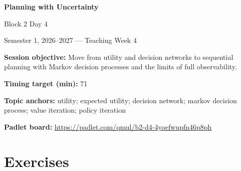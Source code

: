 \documentclass[11pt]{article}
\begin{document}
\begin{center}\LARGE\bfseries Planning with Uncertainty\end{center}

\begin{center}\large Block 2 Day 4\end{center}

\begin{center}Semester 1, 2026--2027 --- Teaching Week 4\end{center}

\begin{tcolorbox}[colback=MidnightBlue!4,colframe=MidnightBlue,title={Session Overview},fonttitle=\bfseries,breakable]
\textbf{Session objective:} Move from utility and decision networks to sequential planning with Markov decision processes and the limits of full observability.

\textbf{Timing target (min):} 71

\textbf{Topic anchors:} utility; expected utility; decision network; markov decision process; value iteration; policy iteration

\textbf{Padlet board:} \url{https://padlet.com/qmul/b2-d4-4yoefwupfn46p8ph}
\end{tcolorbox}

\section*{Exercises}
\end{document}

